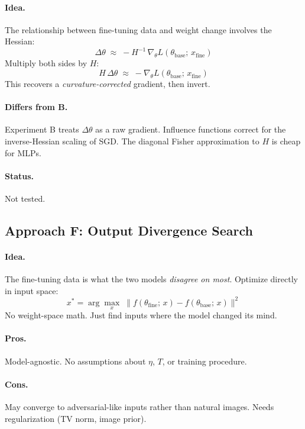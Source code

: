 \documentclass[11pt,a4paper]{article}
\begin{document}
\paragraph{Idea.} The relationship between fine-tuning data and weight change involves the Hessian:
\[
  \Delta\theta \;\approx\; -H^{-1}\,\nabla_\theta L(\theta_{\mathrm{base}};\, x_{\mathrm{fine}})
\]
Multiply both sides by $H$:
\[
  H\,\Delta\theta \;\approx\; -\nabla_\theta L(\theta_{\mathrm{base}};\, x_{\mathrm{fine}})
\]
This recovers a \emph{curvature-corrected} gradient, then invert.

\paragraph{Differs from B.} Experiment B treats $\Delta\theta$ as a raw gradient. Influence functions correct for the inverse-Hessian scaling of SGD. The diagonal Fisher approximation to $H$ is cheap for MLPs.

\paragraph{Status.} \colorbox{yellow!30}{Not tested.}

\subsection{Approach F: Output Divergence Search}

\paragraph{Idea.} The fine-tuning data is what the two models \emph{disagree on most}. Optimize directly in input space:
\[
  x^* = \arg\max_x \;\bigl\|f(\theta_{\mathrm{fine}};\, x) - f(\theta_{\mathrm{base}};\, x)\bigr\|^2
\]
No weight-space math. Just find inputs where the model changed its mind.

\paragraph{Pros.} Model-agnostic. No assumptions about $\eta$, $T$, or training procedure.

\paragraph{Cons.} May converge to adversarial-like inputs rather than natural images. Needs regularization (TV norm, image prior).
\end{document}

